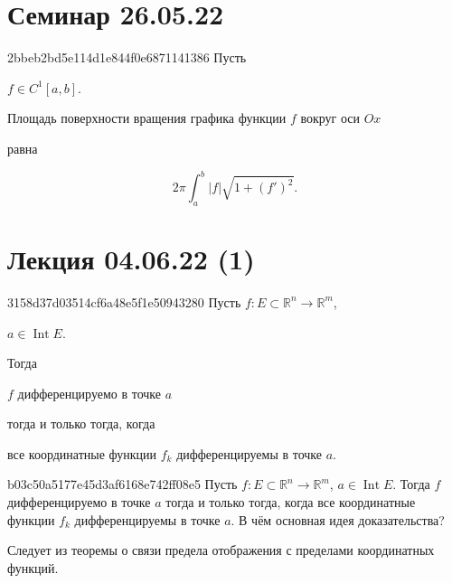 \section{Семинар 26.05.22}
\begin{note}{2bbeb2bd5e114d1e844f0e6871141386}
    Пусть \begin{icloze}{3}\({ f \in C^{1}[a, b] }\).\end{icloze} \begin{icloze}{2}Площадь поверхности вращения графика функции \({ f }\) вокруг оси \({ Ox }\)\end{icloze} равна
    \begin{icloze}{1}
        \[
            2\pi \int_{a}^{b} \left\lvert f \right\rvert \sqrt{1 + \left( f' \right)^2}.
        \]
    \end{icloze}
\end{note}

\section{Лекция 04.06.22 (1)}
\begin{note}{3158d37d03514cf6a48e5f1e50943280}
    Пусть \({ f : E \subset \mathbb R^{n} \to \mathbb R^{m} }\),\: \begin{icloze}{4}\({ a \in \operatorname{Int} E }\).\end{icloze}
    Тогда \begin{icloze}{2}\({ f }\) дифференцируемо в точке \({ a }\)\end{icloze} \begin{icloze}{3}тогда и только тогда, когда\end{icloze} \begin{icloze}{1}все координатные функции \({ f_k }\) дифференцируемы в точке \({ a }\).\end{icloze}
\end{note}

\begin{note}{b03c50a5177e45d3af6168e742ff08e5}
    Пусть \({ f : E \subset \mathbb R^{n} \to \mathbb R^{m} }\),\: \({ a \in \operatorname{Int} E }\).
    Тогда \({ f }\) дифференцируемо в точке \({ a }\) тогда и только тогда, когда все координатные функции \({ f_k }\) дифференцируемы в точке \({ a }\).
    В чём основная идея доказательства?

    \begin{cloze}{1}
        Следует из теоремы о связи предела отображения с пределами координатных функций.
    \end{cloze}
\end{note}

